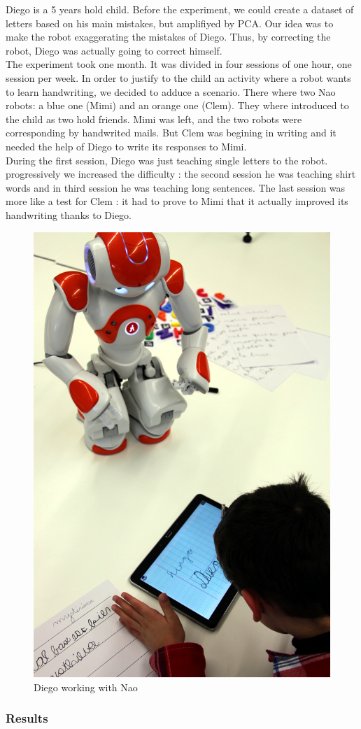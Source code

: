 \documentclass{article}
\begin{document}
Diego is a 5 years hold child. 
Before the experiment, we could create a dataset of letters based on his main
mistakes, but amplifiyed by PCA. Our idea was to make the robot
exaggerating the mistakes of Diego. Thus, by correcting the robot, 
Diego was actually going to correct himself.\\

The experiment took one month. It was divided in four sessions of one hour, one session per week.
In order to justify to the child an activity where a robot wants to learn
handwriting, we decided to adduce a scenario. There where two Nao robots: a
blue one (Mimi) and an orange one (Clem). They where introduced to the child as
two hold friends. Mimi was left, and the two robots were corresponding by
handwrited mails. But Clem was begining in writing and it needed the help of
Diego to write its responses to Mimi.\\

During the first session, Diego was just teaching single letters to the robot.
progressively we increased the difficulty : the second session he was teaching
shirt words and in third session he was teaching long sentences. The last session was more like a test for Clem
: it had to prove to Mimi that it actually improved its handwriting thanks to
Diego. 


\begin{figure}
    \centering
    \includegraphics[width=0.5\linewidth]{diego}
    \caption{Diego working with Nao}
    \label{fig:diego}
\end{figure}


\subsubsection{Results}
\end{document}
